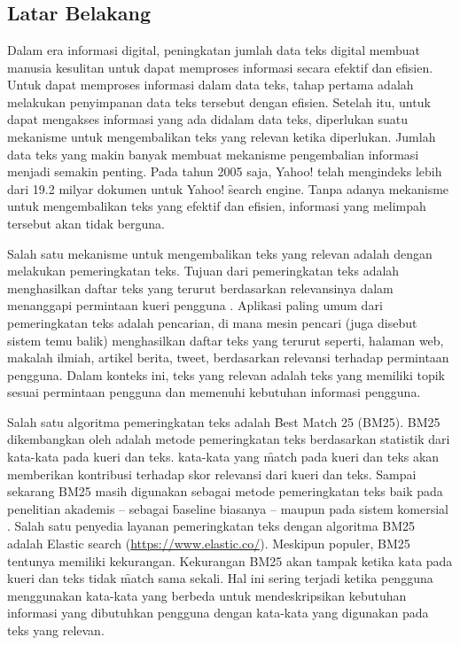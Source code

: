 \chapter{\babSatu}
\label{bab:1}

\section{Latar Belakang}
\label{sec:latar-belakang}

Dalam era informasi digital, peningkatan jumlah data teks digital membuat manusia kesulitan untuk dapat memproses informasi secara efektif dan efisien. Untuk dapat memproses informasi dalam data teks, tahap pertama adalah melakukan penyimpanan data teks tersebut dengan efisien. Setelah itu, untuk dapat mengakses informasi yang ada didalam data teks, diperlukan suatu mekanisme untuk mengembalikan teks yang relevan ketika diperlukan. Jumlah data teks yang makin banyak membuat mekanisme pengembalian informasi menjadi semakin penting. Pada tahun 2005 saja, Yahoo! telah mengindeks lebih dari 19.2 milyar dokumen \citep{LETOR} untuk Yahoo! \f{search engine}. Tanpa adanya mekanisme untuk mengembalikan teks yang efektif dan efisien, informasi yang melimpah tersebut akan tidak berguna.

Salah satu mekanisme untuk mengembalikan teks yang relevan adalah dengan melakukan pemeringkatan teks. Tujuan dari pemeringkatan teks adalah menghasilkan daftar teks yang terurut berdasarkan relevansinya dalam menanggapi permintaan kueri pengguna \citep{textrankingsurvey}. Aplikasi paling umum dari pemeringkatan teks adalah pencarian, di mana mesin pencari (juga disebut sistem temu balik) menghasilkan daftar teks yang terurut seperti, halaman web, makalah ilmiah, artikel berita, tweet, berdasarkan relevansi terhadap permintaan pengguna. Dalam konteks ini, teks yang relevan adalah teks yang memiliki topik sesuai permintaan pengguna dan memenuhi kebutuhan informasi pengguna.

Salah satu algoritma pemeringkatan teks adalah \f{Best Match} 25 (BM25). BM25 dikembangkan oleh \cite{BM25ori} adalah metode pemeringkatan teks berdasarkan statistik dari kata-kata pada kueri dan teks. kata-kata yang \f{match} pada kueri dan teks akan memberikan kontribusi terhadap skor relevansi dari kueri dan teks. Sampai sekarang BM25 masih digunakan sebagai metode pemeringkatan teks baik pada penelitian akademis -- sebagai \f{baseline} biasanya -- maupun pada sistem komersial \citep{textrankingsurvey}. Salah satu penyedia layanan pemeringkatan teks dengan algoritma BM25 adalah Elastic search (\url{https://www.elastic.co/}). Meskipun populer, BM25 tentunya memiliki kekurangan. Kekurangan BM25 akan tampak ketika kata pada kueri dan teks tidak \f{match} sama sekali. Hal ini sering terjadi ketika pengguna menggunakan kata-kata yang berbeda untuk mendeskripsikan kebutuhan informasi yang dibutuhkan pengguna dengan kata-kata yang digunakan pada teks yang relevan.

